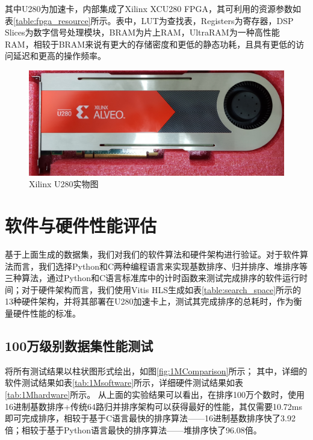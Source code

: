 其中U280为加速卡，内部集成了Xilinx XCU280 FPGA，其可利用的资源参数如表\ref{table:fpga_resource}所示。表中，LUT为查找表，Registers为寄存器，DSP Slices为数字信号处理模块，BRAM为片上RAM，UltraRAM为一种高性能RAM，相较于BRAM来说有更大的存储密度和更低的静态功耗，且具有更低的访问延迟和更高的操作频率。
\begin{figure}[htbp]
    \centering
    \includegraphics[width=\linewidth]{figures/U280.png}
    \caption{Xilinx U280实物图}
    \label{fig:U280}
\end{figure}



\section{软件与硬件性能评估}

基于上面生成的数据集，我们对我们的软件算法和硬件架构进行验证。对于软件算法而言，我们选择Python和C两种编程语言来实现基数排序、归并排序、堆排序等三种算法，通过Python和C语言标准库中的计时函数来测试完成排序的软件运行时间；对于硬件架构而言，我们使用Vitis HLS生成如表\ref{table:search_space}所示的13种硬件架构，并将其部署在U280加速卡上，测试其完成排序的总耗时，作为衡量硬件性能的标准。

\subsection{100万级别数据集性能测试}
将所有测试结果以柱状图形式绘出，如图\ref{fig:1MComparison}所示；
其中，详细的软件测试结果如表\ref{tab:1Msoftware}所示，详细硬件测试结果如表\ref{tab:1Mhardware}所示。
从上面的实验结果可以看出，在排序100万个数时，使用16进制基数排序+传统64路归并排序架构可以获得最好的性能，其仅需要10.72ms即可完成排序，相较于基于C语言最快的排序算法——16进制基数排序快了3.92倍；相较于基于Python语言最快的排序算法——堆排序快了96.08倍。

